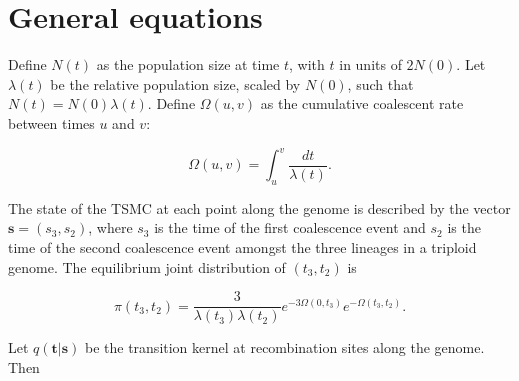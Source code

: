 \documentclass{article}
\begin{document}
\section{General equations}

Define $N(t)$ as the population size at time $t$, with $t$ in units of $2N(0)$.
Let $\lambda(t)$ be the relative population size, scaled by $N(0)$, such that
$N(t) = N(0)\lambda(t)$. Define $\Omega(u,v)$ as the cumulative coalescent rate
between times $u$ and $v$:

\begin{equation}
    \Omega(u,v) = \int_u^v \frac{dt}{\lambda(t)}.
\end{equation}

The state of the TSMC at each point along the genome is described by the vector
$\boldsymbol{s} = (s_3,s_2)$, where $s_3$ is the time of the first coalescence
event and $s_2$ is the time of the second coalescence event amongst the three
lineages in a triploid genome. The equilibrium joint distribution of
$(t_3,t_2)$ is

\begin{equation}
    \pi(t_3,t_2) = \frac{3}{\lambda(t_3)\lambda(t_2)}e^{-3\Omega(0,t_3)}e^{-\Omega(t_3,t_2)}.
    \label{eq:equilibriumjointdistn}
\end{equation}

Let $q(\boldsymbol{t}|\boldsymbol{s})$ be the transition kernel at
recombination sites along the genome. Then
\end{document}
